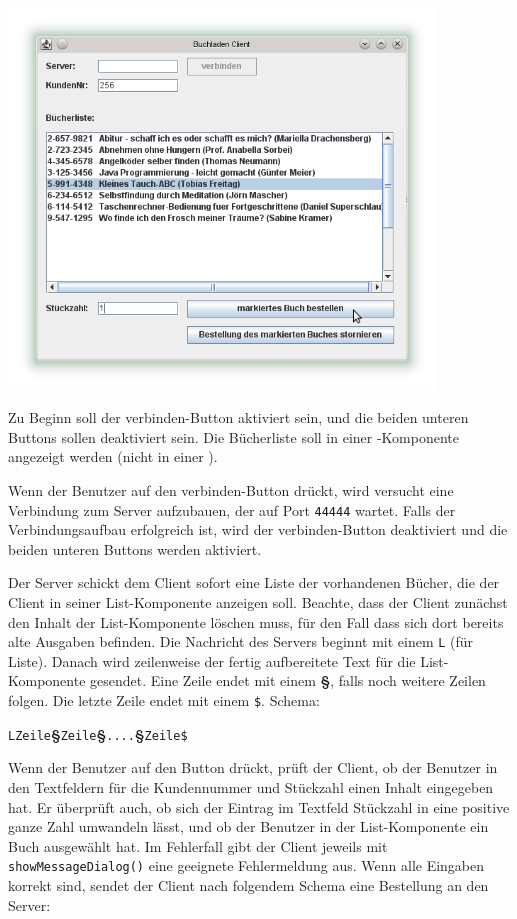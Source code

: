 \begin{center}
\includegraphics[width=0.85\textwidth]{./inf/SEKII/44_Abi-Training/BuchhandelClient.png}
\end{center}

Zu Beginn soll der verbinden-Button aktiviert sein, und die beiden unteren
Buttons sollen deaktiviert sein. Die Bücherliste soll in einer
-Komponente angezeigt werden (nicht in einer
).

Wenn der Benutzer auf den verbinden-Button drückt, wird versucht eine
Verbindung zum Server aufzubauen, der auf Port \lstinline|44444| wartet. Falls
der Verbindungsaufbau erfolgreich ist, wird der verbinden-Button deaktiviert
und die beiden unteren Buttons werden aktiviert.

Der Server schickt dem Client sofort eine Liste der vorhandenen Bücher, die der
Client in seiner List-Komponente anzeigen soll. Beachte, dass der Client
zunächst den Inhalt der List-Komponente löschen muss, für den Fall dass sich
dort bereits alte Ausgaben befinden. Die Nachricht des Servers beginnt mit
einem \lstinline|L| (für Liste). Danach wird zeilenweise der fertig aufbereitete
Text für die List-Komponente gesendet. Eine Zeile endet mit einem \textbf{§},
falls noch weitere Zeilen folgen. Die letzte Zeile endet mit einem
\lstinline|$|. Schema:

\lstinline|LZeile|\textbf{§}\lstinline|Zeile|\textbf{§}\lstinline|....|\textbf{§}\lstinline|Zeile$|

Wenn der Benutzer auf den Button  drückt,
prüft der Client, ob der Benutzer in den Textfeldern für die Kundennummer und
Stückzahl einen Inhalt eingegeben hat. Er überprüft auch, ob sich der Eintrag
im Textfeld Stückzahl in eine positive ganze Zahl umwandeln lässt, und ob der
Benutzer in der List-Komponente ein Buch ausgewählt hat. Im Fehlerfall gibt der
Client jeweils mit \lstinline|showMessageDialog()| eine geeignete Fehlermeldung
aus. Wenn alle Eingaben korrekt sind, sendet der Client nach folgendem Schema
eine Bestellung an den Server:

